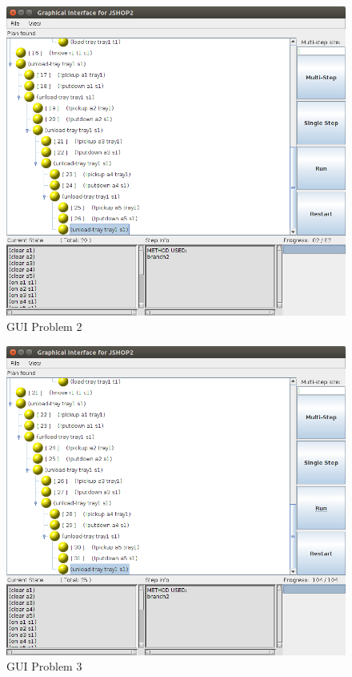 \documentclass[paper=a4, fontsize=11pt]{scrartcl}
\begin{document}
	\begin{figure}[h!]
	\centering
	\includegraphics[width=1\linewidth]{images/problem2_gui}
	\caption{GUI Problem 2}
	\label{fig:problem2_gui}
	\end{figure}
	
	\begin{figure}[h!]
	\centering
	\includegraphics[width=1\linewidth]{images/problem3_gui}
	\caption{GUI Problem 3}
	\label{fig:problem3_gui}
	\end{figure}
	
\end{document}

